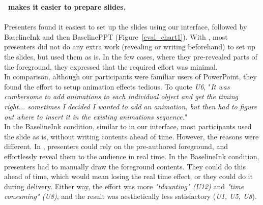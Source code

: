 \textbf{\interface\ makes it easier to prepare slides.}\\
\\
Presenters found it easiest to set up the slides using our interface, followed by BaselineInk and then BaselinePPT (Figure~\ref{eval_chart1}). With \interface, most presenters did not do any extra work (revealing or writing beforehand) to set up the slides, but used them as is. In the few cases, where they pre-revealed parts of the foreground, they expressed that the required effort was minimal. \\
In comparison, although our participants were familiar users of PowerPoint, they found the effort to setup animation effects tedious. To quote \textit{U6}, "\textit{It was cumbersome to add animations to each individual object and get the timing right... sometimes I decided I wanted to add an animation, but then had to figure out where to insert it in the existing animations sequence.}"\\
In the BaselineInk condition, similar to in our interface, most participants used the slide as is, without writing contents ahead of time. However, the reasons were different. In \interface, presenters could rely on the pre-authored foreground, and effortlessly reveal them to the audience in real time. In the BaselineInk condition, presenters had to manually draw the foreground contents. They could do this ahead of time, which would mean losing the real time effect, or they could do it during delivery. Either way, the effort was more \textit{"tdaunting"  (U12)} and  \textit{"time consuming" (U8)}, and the result was aesthetically less satisfactory (\textit{U1, U5, U8}).  \\


